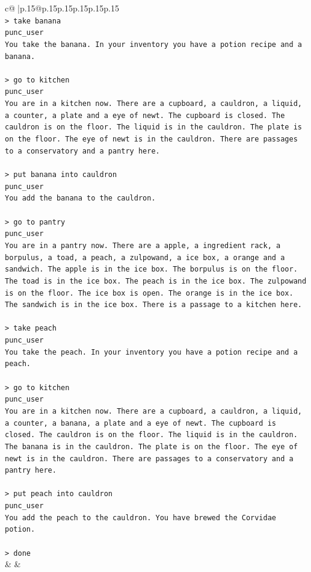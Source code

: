 \documentclass{article}
\begin{document}
{\begin{supertabular}{c@{$\;$}|p{.15\linewidth}@{}p{.15\linewidth}p{.15\linewidth}p{.15\linewidth}p{.15\linewidth}p{.15\linewidth}}
{{{\\ 
\texttt{> take banana} \\
\texttt{punc\_user} \\
\texttt{You take the banana. In your inventory you have a potion recipe and a banana.} \\
\\ 
\texttt{> go to kitchen} \\
\texttt{punc\_user} \\
\texttt{You are in a kitchen now. There are a cupboard, a cauldron, a liquid, a counter, a plate and a eye of newt. The cupboard is closed. The cauldron is on the floor. The liquid is in the cauldron. The plate is on the floor. The eye of newt is in the cauldron. There are passages to a conservatory and a pantry here.} \\
\\ 
\texttt{> put banana into cauldron} \\
\texttt{punc\_user} \\
\texttt{You add the banana to the cauldron.} \\
\\ 
\texttt{> go to pantry} \\
\texttt{punc\_user} \\
\texttt{You are in a pantry now. There are a apple, a ingredient rack, a borpulus, a toad, a peach, a zulpowand, a ice box, a orange and a sandwich. The apple is in the ice box. The borpulus is on the floor. The toad is in the ice box. The peach is in the ice box. The zulpowand is on the floor. The ice box is open. The orange is in the ice box. The sandwich is in the ice box. There is a passage to a kitchen here.} \\
\\ 
\texttt{> take peach} \\
\texttt{punc\_user} \\
\texttt{You take the peach. In your inventory you have a potion recipe and a peach.} \\
\\ 
\texttt{> go to kitchen} \\
\texttt{punc\_user} \\
\texttt{You are in a kitchen now. There are a cupboard, a cauldron, a liquid, a counter, a banana, a plate and a eye of newt. The cupboard is closed. The cauldron is on the floor. The liquid is in the cauldron. The banana is in the cauldron. The plate is on the floor. The eye of newt is in the cauldron. There are passages to a conservatory and a pantry here.} \\
\\ 
\texttt{> put peach into cauldron} \\
\texttt{punc\_user} \\
\texttt{You add the peach to the cauldron. You have brewed the Corvidae potion.} \\
\\ 
\texttt{> done} \\
            }
        }
    }
    & & \\ \\


\end{supertabular}}
\end{document}
